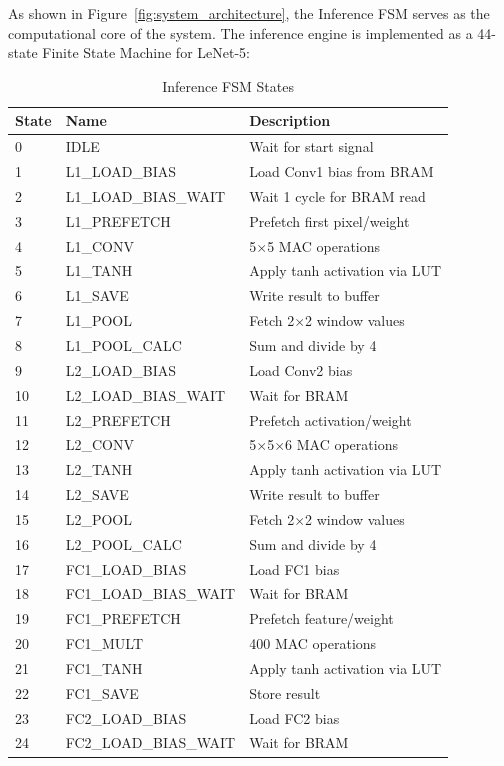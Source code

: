 \documentclass[12pt,a4paper]{report}
\begin{document}
As shown in Figure~\ref{fig:system_architecture}, the Inference FSM serves as the computational core of the system. The inference engine is implemented as a 44-state Finite State Machine for LeNet-5:

\begin{table}[H]
\centering
\caption{Inference FSM States}
\begin{tabular}{lll}
\toprule
\textbf{State} & \textbf{Name} & \textbf{Description} \\
\midrule
0 & IDLE & Wait for start signal \\
1 & L1\_LOAD\_BIAS & Load Conv1 bias from BRAM \\
2 & L1\_LOAD\_BIAS\_WAIT & Wait 1 cycle for BRAM read \\
3 & L1\_PREFETCH & Prefetch first pixel/weight \\
4 & L1\_CONV & 5$\times$5 MAC operations \\
5 & L1\_TANH & Apply tanh activation via LUT \\
6 & L1\_SAVE & Write result to buffer \\
7 & L1\_POOL & Fetch 2$\times$2 window values \\
8 & L1\_POOL\_CALC & Sum and divide by 4 \\
9 & L2\_LOAD\_BIAS & Load Conv2 bias \\
10 & L2\_LOAD\_BIAS\_WAIT & Wait for BRAM \\
11 & L2\_PREFETCH & Prefetch activation/weight \\
12 & L2\_CONV & 5$\times$5$\times$6 MAC operations \\
13 & L2\_TANH & Apply tanh activation via LUT \\
14 & L2\_SAVE & Write result to buffer \\
15 & L2\_POOL & Fetch 2$\times$2 window values \\
16 & L2\_POOL\_CALC & Sum and divide by 4 \\
17 & FC1\_LOAD\_BIAS & Load FC1 bias \\
18 & FC1\_LOAD\_BIAS\_WAIT & Wait for BRAM \\
19 & FC1\_PREFETCH & Prefetch feature/weight \\
20 & FC1\_MULT & 400 MAC operations \\
21 & FC1\_TANH & Apply tanh activation via LUT \\
22 & FC1\_SAVE & Store result \\
23 & FC2\_LOAD\_BIAS & Load FC2 bias \\
24 & FC2\_LOAD\_BIAS\_WAIT & Wait for BRAM \\

\end{tabular}
\end{table}
\end{document}
